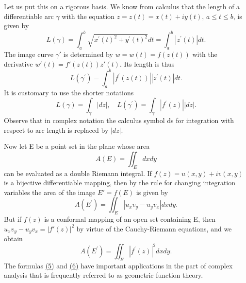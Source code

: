 Let us put this on a rigorous basis. We know from calculus that the length of a differentiable arc $\gamma$ with the equation $z = z(t) = x(t) + iy(t)$, $a \leq t \leq b$, is given by
\begin{equation*}
L (\gamma) = \int_ {a} ^ {b} \sqrt {x ^ {\prime} (t) ^ {2} + y ^ {\prime} (t) ^ {2}} d t = \int_ {a} ^ {b} | z ^ {\prime} (t) | d t.
\end{equation*}
The image curve $\gamma'$ is determined by $w = w(t) = f(z(t))$ with the derivative $w'(t) = f'(z(t))z'(t)$. Its length is thus
\begin{equation*}
L (\gamma^ {\prime}) = \int_ {a} ^ {b} | f ^ {\prime} (z (t)) | | z ^ {\prime} (t) | d t.
\end{equation*}
It is customary to use the shorter notations
\begin{equation*}
L (\gamma) = \int_ {\gamma} | d z |, \quad L (\gamma^ {\prime}) = \int_ {\gamma} | f ^ {\prime} (z) | | d z |.\tag{5}\label{eq:3.5}
\end{equation*}
Observe that in complex notation the calculus symbol ds for integration with respect to arc length is replaced by $|dz|$.

Now let E be a point set in the plane whose area
\begin{equation*}
A (E) = \iint_ {E} d x d y
\end{equation*}
can be evaluated as a double Riemann integral. If $f(z) = u(x,y) + iv(x,y)$ is a bijective differentiable mapping, then by the rule for changing integration variables the area of the image $E' = f(E)$ is given by
\begin{equation*}
A (E ^ {\prime}) = \iint_ {E} | u _ {x} v _ {y} - u _ {y} v _ {x} | d x d y.
\end{equation*}
But if $f(z)$ is a conformal mapping of an open set containing E, then $u_{x}v_{y} - u_{y}v_{x} = |f'(z)|^{2}$ by virtue of the Cauchy-Riemann equations, and we obtain
\begin{equation*}
A (E ^ {\prime}) = \iint_ {E} | f ^ {\prime} (z) | ^ {2} d x d y.\tag{6}\label{eq:3.6}
\end{equation*}
The formulas \hyperref[eq:3.5]{(5)} and \hyperref[eq:3.6]{(6)} have important applications in the part of complex analysis that is frequently referred to as geometric function theory.


